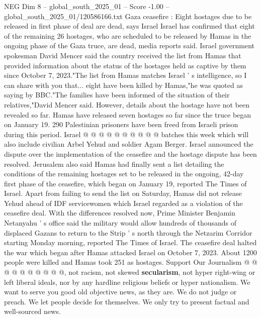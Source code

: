 \begin{textsample}{NEG Dim 8 – global\_south\_2025\_01 – Score -1.00 – global\_south\_2025\_01/120586166.txt}  \label{ex:f8_neg_138}
Gaza ceasefire : Eight hostages due to be released in first phase of deal are dead, says Israel Israel has confirmed that eight of the remaining 26 hostages, who are scheduled to be released by Hamas in the ongoing phase of the Gaza truce, are dead, media reports said.
Israel government spokesman David Mencer said the country received the list from Hamas that provided information about the status of the hostages held as captive by them since October 7, 2023."The list from Hamas matches Israel ' s intelligence, so I can share with you that... eight have been killed by Hamas,"he was quoted as saying by BBC."The families have been informed of the situation of their relatives,"David Mencer said.
However, details about the hostage have not been revealed so far.
Hamas have released seven hostages so far since the truce began on January 19. 290 Palestinian prisoners have been freed from Israeli prison during this period.
Israel @ @ @ @ @ @ @ @ @ @ batches this week which will also include civilian Arbel Yehud and soldier Agam Berger.
Israel announced the dispute over the implementation of the ceasefire and the hostage dispute has been resolved.
Jerusalem also said Hamas had finally sent a list detailing the conditions of the remaining hostages set to be released in the ongoing, 42-day first phase of the ceasefire, which began on January 19, reported The Times of Israel.
Apart from failing to send the list on Saturday, Hamas did not release Yehud ahead of IDF servicewomen which Israel regarded as a violation of the ceasefire deal.
With the differences resolved now, Prime Minister Benjamin Netanyahu ' s office said the military would allow hundreds of thousands of displaced Gazans to return to the Strip ' s north through the Netzarim Corridor starting Monday morning, reported The Times of Israel.
The ceasefire deal halted the war which began after Hamas attacked Israel on October 7, 2023.
About 1200 people were killed and Hamas took 251 as hostages.
Support Our Journalism @ @ @ @ @ @ @ @ @ @, not racism, not skewed \textbf{secularism}, not hyper right-wing or left liberal ideals, nor by any hardline religious beliefs or hyper nationalism.
We want to serve you good old objective news, as they are.
We do not judge or preach.
We let people decide for themselves.
We only try to present factual and well-sourced news.

\end{textsample}
